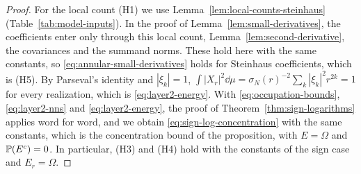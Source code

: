 \begin{proof}
For the local count (H1) we use Lemma~\ref{lem:local-counts-steinhaus}
(Table~\ref{tab:model-inputs}).
In the proof of Lemma~\ref{lem:small-derivatives}, the coefficients enter
only through this local count, Lemma~\ref{lem:second-derivative}, the
covariances and the summand norms. These hold here with the same
constants, so \eqref{eq:annular-small-derivatives} holds for Steinhaus
coefficients, which is (H5).
By Parseval's identity and $|\xi_k|=1$,
$\int|X_r|^2\dd\mu=\sigma_N(r)^{-2}\sum_k|\xi_k|^2r^{2k}=1$ for every
realization, which is \eqref{eq:layer2-energy}.
With \eqref{eq:occupation-bounds}, \eqref{eq:layer2-nns} and
\eqref{eq:layer2-energy}, the proof of Theorem~\ref{thm:sign-logarithms}
applies word for word, and we obtain \eqref{eq:sign-log-concentration}
with the same constants, which is the concentration bound of the
proposition, with $E=\Omega$ and $\mathbb P(E^c)=0$.
In particular, (H3) and (H4) hold with the constants of the sign case
and $E_r=\Omega$.


\end{proof}
